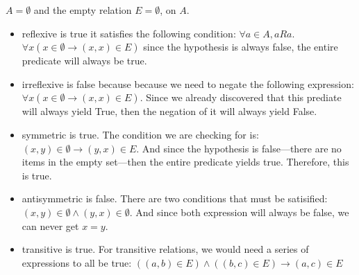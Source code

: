 \documentclass{article}
\begin{document}
$A = \emptyset$ and the empty relation $E = \emptyset$, on $A$.

\begin{itemize}
    \item reflexive is true it satisfies the following condition: $\forall a \in A, aRa$. $\forall x(x \in \emptyset \to (x,x) \in E)$ since the hypothesis is always false, the entire predicate will always be true.
    \item irreflexive is false because because we need to negate the following expression: $\forall x(x \in \emptyset \to (x,x) \in E)$. Since we already discovered that this prediate will always yield True, then the negation of it will always yield False.
    \item symmetric is true. The condition we are checking for is: $(x,y) \in \emptyset \to (y,x) \in E$. And since the hypothesis is false—there are no items in the empty set—then the entire predicate yields true. Therefore, this is true.
    \item antisymmetric is false. There are two conditions that must be satisified: $(x,y) \in \emptyset \land (y,x) \in \emptyset$. And since both expression will always be false, we can never get $x = y$.
    \item transitive is true. For transitive relations, we would need a series of expressions to all be true: $((a,b) \in E) \land ((b,c) \in E) \to (a,c) \in E$ 
\end{itemize}
\end{document}
